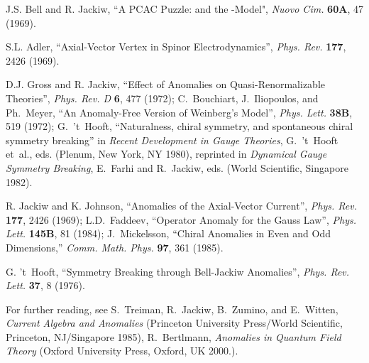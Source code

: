\documentclass[a4paper,12pt,twoside]{article}
\begin{document}
\begin{thebibliography}{99}

\def\Journal#1#2#3#4{{\em #1} {\bf #2}, #3 (#4)}
\def\add#1#2#3{{\bf #1}, #2 (#3)}
\def\Book#1#2#3#4{{\em #1}  (#2, #3 #4)}
\def\Bookeds#1#2#3#4#5{{\em #1}, #2  (#3, #4 #5)}

\def\NPB{Nucl. Phys.} %
\def\PLA{Phys. Lett.} %
\def\PLB{Phys. Lett.} %
\def\PRL{Phys. Rev. Lett.}
\def\PRD{Phys. Rev. D}
\def\PR{Phys. Rev.}
\def\ZPC{Z. Phys. C}
\def\SJNP{Sov. J. Nucl. Phys.}
\def\AnnP{Ann. Phys.\ ({\em NY})}
\def\JETPL{JETP Lett.}
\def\LMP{Lett. Math. Phys.}
\def\CMP{Comm. Math. Phys.}
\def\PTP{Prog. Theor. Phys.}
\def\PNAS{Proc. Nat. Acad. Sci.}

J.S. Bell and R. Jackiw, ``A PCAC Puzzle: \myHighlight{$\pi^0\to 2\gamma$}\coordHE{} and the
\myHighlight{$\sigma$}\coordHE{}-Model", \Journal{Nuovo Cim.}{60A}{47}{1969}.

S.L. Adler, ``Axial-Vector Vertex in Spinor Electrodynamics'', 
\Journal{\PR}{177}{2426}{1969}.

D.J. Gross and R. Jackiw, ``Effect of Anomalies on Quasi-Renormalizable Theories'', 
\Journal{\PRD}{6}{477}{1972};  C.~Bouchiart, J.~Iliopoulos, and Ph.~Meyer, ``An
Anomaly-Free Version of Weinberg's Model'', \Journal{\PLA}{38B}{519}{1972}; 
G.~'t~Hooft, ``Naturalness, chiral symmetry, and spontaneous chiral symmetry
breaking'' in \Bookeds{Recent Development in Gauge Theories}{G.~'t~Hooft et~al.,
eds.}{Plenum}{New York, NY}{1980}, reprinted in  
\Bookeds{Dynamical Gauge Symmetry Breaking}{E.~Farhi and R.~Jackiw,
eds.}{World Scientific}{Singapore}{1982}.

R. Jackiw and K. Johnson, ``Anomalies of the Axial-Vector Current'',
\Journal{\PR}{177}{2426}{1969}; 
L.D.~Faddeev, ``Operator Anomaly for the Gauss Law'',
\Journal{\PLB}{145B}{81}{1984};
J.~Mickelsson, ``Chiral Anomalies in Even and Odd Dimensions,''
\Journal{\CMP}{97}{361}{1985}.

G. 't~Hooft, ``Symmetry Breaking through Bell-Jackiw Anomalies'',
\Journal{\PRL}{37}{8}{1976}.

For further reading, see S.~Treiman, R.~Jackiw, B.~Zumino, and E.~Witten,
\Book{Current Algebra and Anomalies}{Princeton University Press/World
Scientific}{Princeton, NJ/Singapore}{1985}, R.~Bertlmann, \Book{Anomalies in
Quantum Field Theory}{Oxford University Press}{Oxford, UK}{2000.}. 

\end{thebibliography}
\end{document}
